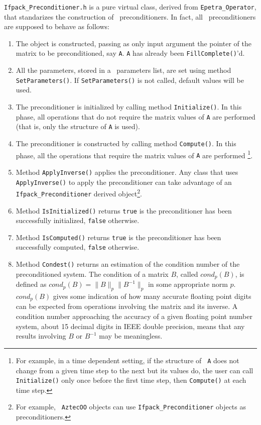 \verb!Ifpack_Preconditioner.h! is a pure virtual class, derived from
\verb!Epetra_Operator!, that standarizes the construction of \ifpack\
preconditioners. In fact, all \ifpack\ preconditioners are supposed to behave
as follows:
\begin{enumerate}
\item The object is constructed, passing as only input argument the
pointer of the matrix to be preconditioned, say {\tt A}. {\tt A} has already
been {\tt FillComplete()}'d.
%
\item All the parameters, stored in a \teuchos\ parameters list, are
set using method \verb!SetParameters()!. If \verb!SetParameters()! is not
called, default values will be used.
%
\item The preconditioner is initialized by calling method \verb!Initialize()!.
In this phase, all operations that do not require the matrix values of {\tt A}
are performed (that is, only the structure of {\tt A} is used).
%
\item The preconditioner is constructed by calling method \verb!Compute()!.
In this phase, all the operations that require the matrix values of {\tt A}
are performed
\footnote{For example, in a time dependent setting, if the structure of {\tt
  A} does not change from a given time step to the next but its values do,
  the user can call {\tt Initialize()} only once before the first time step,
  then {\tt Compute()} at each time step.}.
%
\item Method \verb!ApplyInverse()! applies the preconditioner. Any class that
uses \verb!ApplyInverse()! to apply the preconditioner can take advantage of
an \verb!Ifpack_Preconditioner! derived object\footnote{For example, {\tt
  AztecOO} objects can use {\tt Ifpack\_Preconditioner} objects as
    preconditioners.}.
%
\item Method \verb!IsInitialized()! returns {\tt true} is the preconditioner has
been successfully initialized, {\tt false} otherwise.
%
\item Method \verb!IsComputed()! returns {\tt true} is the preconditioner has
been successfully computed, {\tt false} otherwise.
%
\item Method \verb!Condest()! returns an estimation of the condition
number of the preconditioned system.
The condition of a matrix $B$, called $cond_p(B)$, is defined as
$cond_p(B) = \|B\|_p\|B^{-1}\|_p$ in some appropriate norm $p$. 
$cond_p(B)$
gives some indication of how many accurate floating point
digits can be expected from operations involving the matrix and its
inverse.  A condition number approaching the accuracy of a given
floating point number system, about 15 decimal digits in IEEE double
precision, means that any results involving $B$ or $B^{-1}$ may be
meaningless.


\end{enumerate}
